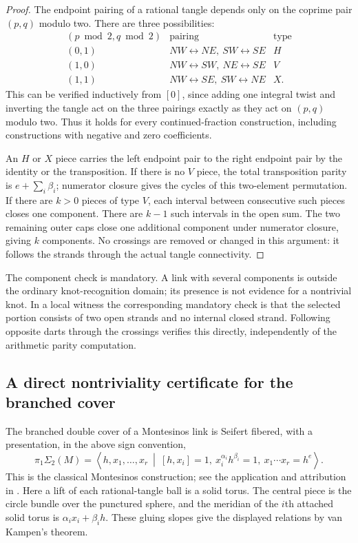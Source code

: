 \documentclass[11pt,a4paper]{article}
\theoremstyle{definition}
\theoremstyle{remark}
\numberwithin{equation}{section}
\begin{document}
\begin{proof}
The endpoint pairing of a rational tangle depends only on the coprime pair
$(p,q)$ modulo two.  There are three possibilities:
\[
\begin{array}{c|c|c}
(p\bmod2,q\bmod2)&\text{pairing}&\text{type}\\\hline
(0,1)&NW\!\leftrightarrow\!NE,\ SW\!\leftrightarrow\!SE&H\\
(1,0)&NW\!\leftrightarrow\!SW,\ NE\!\leftrightarrow\!SE&V\\
(1,1)&NW\!\leftrightarrow\!SE,\ SW\!\leftrightarrow\!NE&X.
\end{array}
\]
This can be verified inductively from $[0]$, since adding one integral twist
and inverting the tangle act on the three pairings exactly as they act on
$(p,q)$ modulo two.  Thus it holds for every continued-fraction construction,
including constructions with negative and zero coefficients.

An $H$ or $X$ piece carries the left endpoint pair to the right endpoint pair
by the identity or the transposition.  If there is no $V$ piece, the total
transposition parity is $e+\sum_i\beta_i$; numerator closure gives the cycles
of this two-element permutation.  If there are $k>0$ pieces of type $V$,
each interval between consecutive such pieces closes one component.  There
are $k-1$ such intervals in the open sum.  The two remaining outer caps
close one additional component under numerator closure, giving $k$ components.
No crossings are removed or changed in this argument: it follows the strands
through the actual tangle connectivity.
\end{proof}

The component check is mandatory.  A link with several components is outside
the ordinary knot-recognition domain; its presence is not evidence for a
nontrivial knot.  In a local witness the corresponding mandatory check is that
the selected portion consists of two open strands and no internal closed
strand.  Following opposite darts through the crossings verifies this directly,
independently of the arithmetic parity computation.

\subsection{A direct nontriviality certificate for the branched cover}

The branched double cover of a Montesinos link is Seifert fibered, with a
presentation, in the above sign convention,
\begin{equation}\label{eq:mon:sfs-group}
 \pi_1\Sigma_2(M)=
 \left\langle h,x_1,\ldots,x_r\ \middle|\
 [h,x_i]=1,\ x_i^{\alpha_i}h^{\beta_i}=1,
 \ x_1\cdots x_r=h^e\right\rangle.
\end{equation}
This is the classical Montesinos construction; see the application and
attribution in \cite[proof of Theorem~4.9]{nogueira-salgueiro}.
Here a lift of each rational-tangle ball is a solid torus.  The central piece
is the circle bundle over the punctured sphere, and the meridian of the
$i$th attached solid torus is $\alpha_i x_i+\beta_i h$.  These gluing slopes
give the displayed relations by van Kampen's theorem.
\end{document}
